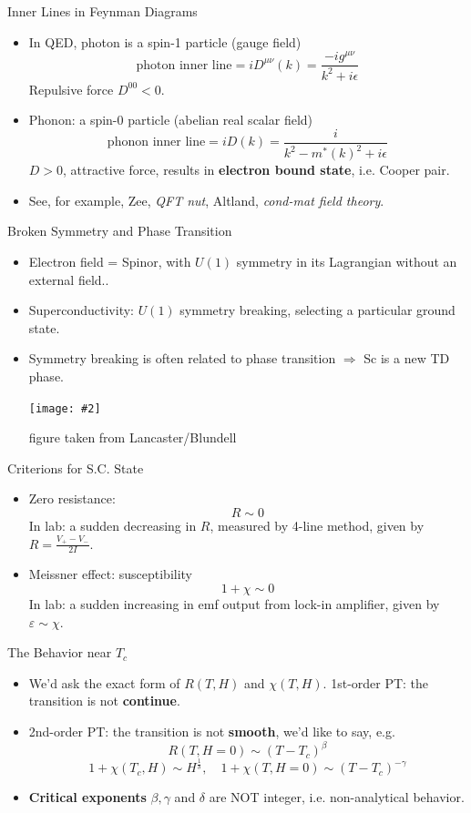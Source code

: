 \documentclass[aspectratio=1610,14pt]{beamer}
\newcommand{\cpic}[2]{
\begin{center}
\texttt{[image: \#2]}
\end{center}
}
\begin{document}
\begin{frame}{Inner Lines in Feynman Diagrams}
\begin{itemize}
\item
In QED, photon is a spin-1 particle (gauge field)
$$\text{photon inner line} =iD^{\mu \nu}(k) = \frac{-ig^{\mu \nu}}{k^2 + i\epsilon}$$
Repulsive force $D^{00} < 0$.
\item
Phonon: a spin-0 particle (abelian real scalar field)
$$\text{phonon inner line} =iD(k) = \frac{i}{k^2 -m^*(k)^2 + i\epsilon}$$
$D>0$, attractive force, results in {\bf electron bound state}, i.e. Cooper pair.
\item
See, for example, Zee, \emph{QFT nut}, Altland, \emph{cond-mat field theory}.
\end{itemize}

\end{frame}

\begin{frame}{Broken Symmetry and Phase Transition}
\begin{itemize}
\item
Electron field = Spinor, with $U(1)$ symmetry in its Lagrangian without an external field..
\item
Superconductivity: $U(1)$ symmetry breaking, selecting a particular ground state.
\item
Symmetry breaking is often related to phase transition $\Rightarrow$ Sc is a new TD phase.
\cpic{0.5}{sb}{\tiny *figure taken from Lancaster/Blundell}
\end{itemize}
\end{frame}

\begin{frame}{Criterions for S.C. State}
\begin{itemize}
\item
Zero resistance:
$$
R\sim 0
$$
In lab: a sudden decreasing in $R$, measured by 4-line method, given by $ R = \frac{V_+ - V_-}{2I}$.
\item
Meissner effect: susceptibility $$1+ \chi \sim 0$$
In lab: a sudden increasing in emf output from lock-in amplifier, given by $\varepsilon \sim \chi$.
\end{itemize}
\end{frame}

\begin{frame}{The Behavior near $T_c$}
\begin{itemize}
\item
We'd ask the exact form of $R(T,H)$ and $\chi(T,H)$.
\iten
1st-order PT: the transition is not {\bf continue}.
\item
2nd-order PT: the transition is not {\bf smooth}, we'd like to say, e.g. 
$$
R(T,H=0) \sim (T-T_c)^\beta
$$
$$
1+\chi(T_c,H) \sim H^{\frac{1}{\delta}}, \quad 1+\chi(T,H=0) \sim (T-T_c)^{-\gamma}
$$
\item {\bf Critical exponents }$\beta,\gamma$ and $\delta$ are NOT integer, i.e. non-analytical behavior.

\end{itemize}
\end{frame}
\end{document}
